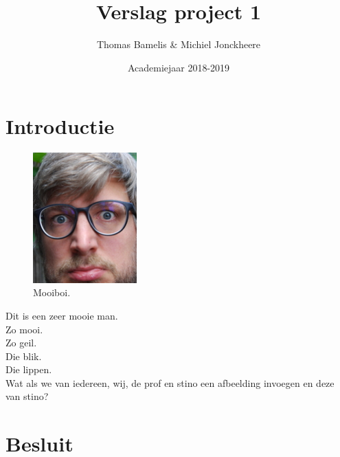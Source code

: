 \documentclass[a4paper,kulak]{kulakarticle}
\date{Academiejaar 2018-2019}
\title{Verslag project 1}
\author{Thomas Bamelis \& Michiel Jonckheere}
\begin{document}
\maketitle

\tableofcontents
\newpage
\section*{Introductie}
\begin{figure}
	\caption{Mooiboi.}
	\label{fig:mooi}
	\includegraphics[width=4cm]{figures/stino.jpg}
\end{figure}
Dit is een zeer mooie man. \\
Zo mooi.\\
Zo geil. \\
Die blik.\\
Die lippen.\\
Wat als we van iedereen, wij, de prof en stino een afbeelding invoegen en deze van stino?

\section*{Besluit}


 
\end{document}
